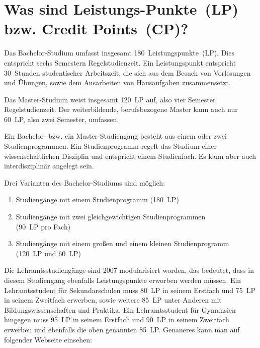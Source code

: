 
\section[Was sind Leistungs-Punkte?]{Was sind Leistungs-Punkte~(LP) bzw. Credit Points~(CP)?}
\label{creditpoints}

Das Bachelor-Studium umfasst insgesamt 180~Leistungspunkte~(LP).
Dies entspricht sechs Semestern Regelstudienzeit.
Ein Leistungspunkt entspricht 30~Stunden studentischer Arbeitszeit, die sich aus dem Besuch von Vorlesungen und Übungen, sowie dem Ausarbeiten von Hausaufgaben zusammensetzt.

Das Master-Studium weist insgesamt 120~LP auf, also vier Semester Regelstudienzeit.
Der weiterbildende, berufsbezogene Master kann auch nur 60~LP, also zwei Semester, umfassen.

Ein Bachelor- bzw. ein Master-Studiengang besteht aus einem oder zwei Studienprogrammen.
Ein Studienprogramm regelt das Studium einer wissenschaftlichen Disziplin und entspricht einem Studienfach.
Es kann aber auch interdisziplinär angelegt sein.

Drei Varianten des Bachelor-Studiums sind möglich:
\begin{enumerate}
    \item Studiengänge mit einem Studienprogramm (180~LP)
    \item Studiengänge mit zwei gleichgewichtigen Studienprogrammen\\
          (90~LP pro Fach)
    \item Studiengänge mit einem großen und einem kleinen Studienprogramm\\
          (120~LP und 60~LP)
\end{enumerate}

Die Lehramtsstudiengänge sind 2007 modularisiert worden, das bedeutet, dass in diesem Studiengang ebenfalls Leistungspunkte erworben werden müssen.
Ein Lehramtsstudent für Sekundarschulen muss 80~LP in seinem Erstfach und 75~LP in seinem Zweitfach erwerben, sowie weitere 85~LP unter Anderen mit Bildungswissenschaften und Praktika.
Ein Lehramtsstudent für Gymansien hingegen muss 95~LP in seinem Erstfach und 90~LP in seinem Zweitfach erwerben und ebenfalls die oben genannten 85~LP.
Genaueres kann man auf folgender Webseite einsehen:\\[1.0em]
